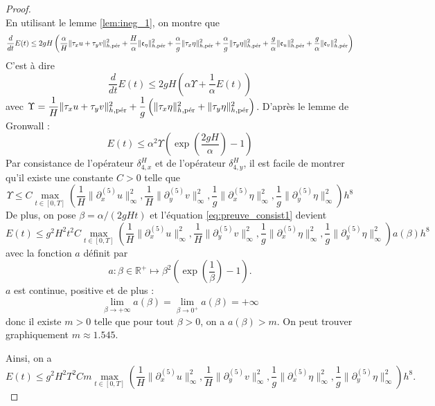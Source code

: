 \begin{proof}
\begin{equation}
\end{equation}
En utilisant le lemme \ref{lem:ineg_1}, on montre que
\begin{equation}
\dfrac{d}{dt} E(t) \leq 2 g H \left( \dfrac{\alpha}{H} \|\tau_x u + \tau_y v \|_{h,\per}^2 + \dfrac{H}{\alpha} \| \mathfrak{e}_{\eta} \|_{h,\per}^2 + \dfrac{\alpha}{g} \| \tau_x \eta \|_{h,\per}^2  + \dfrac{\alpha}{g} \| \tau_y \eta \|_{h,\per}^2 + \dfrac{g}{\alpha} \| \mathfrak{e}_u \|_{h,\per}^2 + \dfrac{g}{\alpha} \| \mathfrak{e}_v \|_{h,\per}^2   \right)
\end{equation}
C'est à dire
\begin{equation}
\dfrac{d}{dt} E(t)\leq 2 g H \left( \alpha \Upsilon + \dfrac{1}{\alpha} E(t) \right)
\end{equation}
avec $\Upsilon = \dfrac{1}{H} \| \tau_x u + \tau_y v \|^2_{h,\per} + \dfrac{1}{g} \left( \| \tau_x \eta \|^2_{h,\per} + \| \tau_y \eta \|^2_{h,\per} \right)$.
D'après le lemme de Gronwall :
\begin{equation}
E(t) \leq \alpha^2 \Upsilon \left( \exp \left( \dfrac{2 g H}{\alpha} \right) -1 \right)
\label{eq:preuve_consist1}
\end{equation}
Par consistance de l'opérateur $\delta_{4,x}^H$ et de l'opérateur $\delta_{4,y}^H$, il est facile de montrer qu'il existe une constante $C>0$ telle que
\begin{equation}
\Upsilon \leq C \max_{t \in [0,T]} \left( \dfrac{1}{H} \| \partial_x^{(5)} u \|^2_{\infty}, \dfrac{1}{H} \| \partial_y^{(5)} v \|^2_{\infty}, \dfrac{1}{g} \| \partial_x^{(5)} \eta \|^2_{\infty}, \dfrac{1}{g} \| \partial_y^{(5)} \eta \|^2_{\infty}  \right) h^8
\end{equation}
De plus, on pose $\beta = \alpha/(2gHt)$ et l'équation \eqref{eq:preuve_consist1} devient 
\begin{equation}
E(t) \leq g^2 H^2 t^2 C \max_{t \in [0,T]} \left( \dfrac{1}{H} \| \partial_x^{(5)} u \|^2_{\infty}, \dfrac{1}{H} \| \partial_y^{(5)} v \|^2_{\infty}, \dfrac{1}{g} \| \partial_x^{(5)} \eta \|^2_{\infty}, \dfrac{1}{g} \| \partial_y^{(5)} \eta \|^2_{\infty}  \right) a(\beta) h^8
\end{equation}
avec la fonction $a$ définit par
\begin{equation}
a :\beta \in \mathbb{R}^+ \mapsto \beta^2 \left( \exp \left( \dfrac{1}{\beta} \right) -1  \right).
\end{equation}
$a$ est continue, positive et de plus :
\begin{equation}
\lim_{\beta \rightarrow + \infty} a(\beta) = \lim_{\beta \rightarrow 0^+} a(\beta) = + \infty
\end{equation}
donc il existe $m > 0$ telle que pour tout $\beta > 0$, on a $a(\beta)>m$. On peut trouver graphiquement $m \approx 1.545$.

Ainsi, on a 
\begin{equation}
E(t) \leq g^2 H^2 T^2 C m \max_{t \in [0,T]} \left( \dfrac{1}{H} \| \partial_x^{(5)} u \|^2_{\infty}, \dfrac{1}{H} \| \partial_y^{(5)} v \|^2_{\infty}, \dfrac{1}{g} \| \partial_x^{(5)} \eta \|^2_{\infty}, \dfrac{1}{g} \| \partial_y^{(5)} \eta \|^2_{\infty}  \right) h^8.
\end{equation}
\end{proof}

